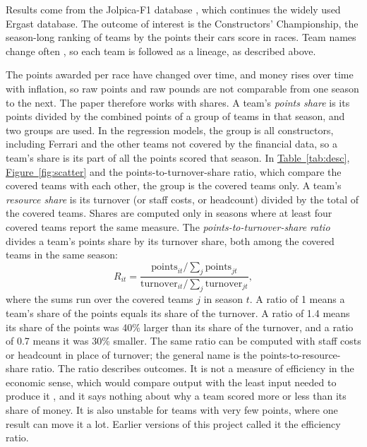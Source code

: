 \documentclass[11pt,a4paper]{article}
\begin{document}
Results come from the Jolpica-F1 database \citep{jolpica}, which continues the widely used Ergast
database. The outcome of interest is the Constructors' Championship, the season-long ranking of teams by the points their
cars score in races. Team names change often \citep{jolpica}, so each team is followed as a lineage, as described above.

The points awarded per race have changed over time, and money rises over time
with inflation, so raw points and raw pounds are not comparable from one season to the next. The paper therefore works
with shares. A team's \textit{points share} is its points divided by the combined points of a group of teams in that
season, and two groups are used. In the regression models, the group is all constructors, including Ferrari and the other
teams not covered by the financial data, so a team's share is its part of all the points scored that season. In
\hyperref[tab:desc]{Table~\ref*{tab:desc}}, \hyperref[fig:scatter]{Figure~\ref*{fig:scatter}} and the
points-to-turnover-share ratio, which compare the covered teams with each other, the group is the covered teams only. A team's \textit{resource share} is its turnover (or staff costs, or headcount) divided by the total of
the covered teams. Shares are computed only in seasons where at least four covered teams report the same measure. The
\textit{points-to-turnover-share ratio} divides a team's points share by its turnover share, both among the covered
teams in the same season:
\begin{equation}
  R_{it} = \frac{\text{points}_{it} / \sum_{j} \text{points}_{jt}}{\text{turnover}_{it} / \sum_{j} \text{turnover}_{jt}},
  \label{eq:ratio}
\end{equation}
where the sums run over the covered teams $j$ in season $t$. A ratio of 1 means a team's share of the points equals its
share of the turnover. A ratio of 1.4 means its share of the points was 40\% larger than its share of the turnover, and a
ratio of 0.7 means it was 30\% smaller. The same ratio can be computed with staff costs or headcount in place of
turnover; the general name is the points-to-resource-share ratio. The ratio describes outcomes. It is not a measure of
efficiency in the economic sense, which would compare output with the least input needed to produce it \citep{farrell1957}, and it says
nothing about why a team scored more or less than its share of money. It is also unstable for teams with very few points,
where one result can move it a lot. Earlier versions of this project called it the efficiency ratio.
\end{document}
